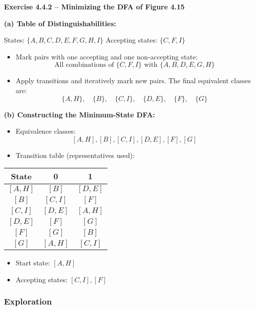 \documentclass{article}
\theoremstyle{theorem}
\theoremstyle{definition}
\theoremstyle{remark}
\begin{document}
\vspace{1em}
\textbf{Exercise 4.4.2 – Minimizing the DFA of Figure 4.15}

\textbf{(a) Table of Distinguishabilities:}

States: $\{A, B, C, D, E, F, G, H, I\}$  
Accepting states: $\{C, F, I\}$

\begin{itemize}
    \item Mark pairs with one accepting and one non-accepting state:
    \[
    \text{All combinations of } \{C, F, I\} \text{ with } \{A, B, D, E, G, H\}
    \]
    \item Apply transitions and iteratively mark new pairs. The final equivalent classes are:
    \[
    \{A, H\}, \quad \{B\}, \quad \{C, I\}, \quad \{D, E\}, \quad \{F\}, \quad \{G\}
    \]
\end{itemize}

\textbf{(b) Constructing the Minimum-State DFA:}

\begin{itemize}
    \item Equivalence classes:
    \[
    [A,H], [B], [C,I], [D,E], [F], [G]
    \]
    \item Transition table (representatives used):
\end{itemize}

\begin{center}
\begin{tabular}{c|c|c}
State & 0 & 1 \\
\hline
$[A,H]$ & $[B]$ & $[D,E]$ \\
$[B]$   & $[C,I]$ & $[F]$ \\
$[C,I]$ & $[D,E]$ & $[A,H]$ \\
$[D,E]$ & $[F]$ & $[G]$ \\
$[F]$   & $[G]$ & $[B]$ \\
$[G]$   & $[A,H]$ & $[C,I]$ \\
\end{tabular}
\end{center}

\begin{itemize}
    \item Start state: $[A,H]$
    \item Accepting states: $[C,I], [F]$
\end{itemize}


\subsubsection{Exploration}
\end{document}
